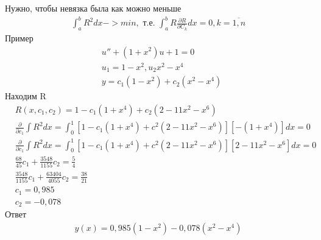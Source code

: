 \documentclass[12pt,a4paper]{article}
\begin{document}
	Нужно, чтобы невязка была как можно меньше\\
	\begin{align*}
	\int_{a}^{b} R^2 dx -> min, \text{ т.е. } \int_{a}^{b} R\displaystyle\frac{\partial R}{\partial C_k}dx = 0, k=\overline{1, n}
	\end{align*}
	Пример \\
	\begin{align*}
	&u'' + (1+x^2)u + 1 = 0\\
	&u_1 = 1 - x^2, u_2  x^2 -x^4\\
	&y = c_1 ( 1-x^2)+ c_2(x^2-x^4)
	\end{align*}
	Находим R\\
	\begin{align*}
	&R(x, c_1, c_2) = 1 - c_1(1+x^4)+c_2(2-11x^2-x^6)\\
	&\frac{\partial}{\partial c_1}\int R^2 dx = \int_{0}^{1} \left[1 - c_1(1+x^4) + c^2(2 - 11x^2 -x^6)\right] \left[-(1+x^4)\right] dx = 0\\
	&\frac{\partial}{\partial c_1}\int R^2 dx = \int_{0}^{1} \left[1 - c_1(1+x^4) + c^2(2 - 11x^2 -x^6)\right] \left[2-11x^2-x^6\right] dx = 0\\
	&\frac{68}{45}c_1 + \frac{3548}{1155}c_2 = \frac{5}{4}\\
	&\frac{3548}{1155}c_1 + \frac{63404}{4055}c_2 = \frac{38}{21}\\
	&c_1 = 0,985\\
	&c_2 = -0,078
	\end{align*}
	Ответ\\
	\begin{align*}
	y(x) = 0,985(1-x^2) - 0,078(x^2-x^4)
	\end{align*}
\end{document}
